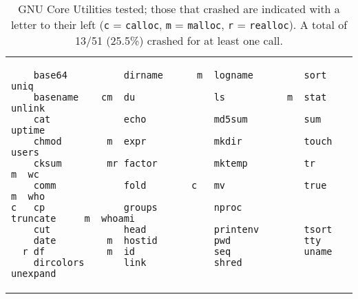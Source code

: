 \begin{table}[h]
\begin{tabular}{l}
\begin{lstlisting}
    base64          dirname      m  logname         sort            uniq
    basename    cm  du              ls           m  stat            unlink
    cat             echo            md5sum          sum             uptime
    chmod        m  expr            mkdir           touch           users
    cksum        mr factor          mktemp          tr           m  wc
    comm            fold        c   mv              true         m  who
c   cp              groups          nproc           truncate     m  whoami
    cut             head            printenv        tsort
    date         m  hostid          pwd             tty
  r df           m  id              seq             uname
    dircolors       link            shred           unexpand
\end{lstlisting}
\end{tabular}
\caption{GNU Core Utilities tested; those that crashed are indicated with a letter to their left (\texttt{c} = \texttt{calloc}, \texttt{m} = \texttt{malloc}, \texttt{r} = \texttt{realloc}). A total of 13/51 (25.5\%) crashed for at least one call.}
\label{lst:coreutils}
\end{table}
